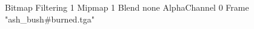 {Bitmap
	{Filtering 1}
	{Mipmap 1}
	{Blend none}
	{AlphaChannel 0}
	{Frame "ash_bush#burned.tga"}
}
